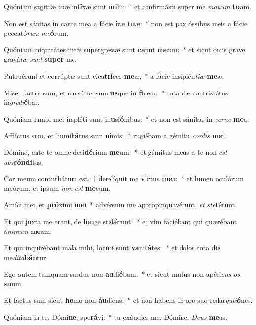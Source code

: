 \item Quóniam sagíttæ tuæ in\textbf{fí}xæ sunt \textbf{mi}hi:~* et confirmásti super me \textit{ma}\textit{num} \textbf{tu}am.
\item Non est sánitas in carne mea a fácie \textbf{i}ræ \textbf{tu}æ:~* non est pax óssibus meis a fácie peccató\textit{rum} \textit{me}\textbf{ó}rum.
\item Quóniam iniquitátes meæ supergréssæ sunt \textbf{ca}put \textbf{me}um:~* et sicut onus grave gravá\textit{tæ} \textit{sunt} \textbf{su}\textbf{per} me.
\item Putruérunt et corrúptæ sunt cica\textbf{trí}ces \textbf{me}æ,~* a fácie insipién\textit{ti}\textit{æ} \textbf{me}æ.
\item Miser factus sum, et curvátus sum \textbf{us}que in \textbf{fi}nem:~* tota die contristátus in\textit{gre}\textit{di}\textbf{é}bar.
\item Quóniam lumbi mei impléti sunt il\textbf{lu}si\textbf{ó}nibus:~* et non est sánitas in \textit{car}\textit{ne} \textbf{me}a.
\item Afflíctus sum, et humili\textbf{á}tus sum \textbf{ni}mis:~* rugiébam a gémitu \textit{cor}\textit{dis} \textbf{me}i.
\item Dómine, ante te omne desi\textbf{dé}rium \textbf{me}um:~* et gémitus meus a te non \textit{est} \textit{abs}\textbf{cón}\textbf{di}tus.
\item Cor meum conturbátum est,~† derelíquit me \textbf{vir}tus \textbf{me}a:~* et lumen oculórum meórum, et ipsum \textit{non} \textit{est} \textbf{me}cum.
\item Amíci mei, et \textbf{pró}ximi \textbf{me}i~* advérsum me appropinquavérunt, \textit{et} \textit{ste}\textbf{té}runt.
\item Et qui juxta me erant, de \textbf{lon}ge ste\textbf{té}runt:~* et vim faciébant qui quærébant á\textit{ni}\textit{mam} \textbf{me}am.
\item Et qui inquirébant mala mihi, locúti sunt \textbf{va}ni\textbf{tá}tes:~* et dolos tota die me\textit{di}\textit{ta}\textbf{bán}tur.
\item Ego autem tamquam surdus non \textbf{au}di\textbf{é}bam:~* et sicut mutus non apéri\textit{ens} \textit{os} \textbf{su}um.
\item Et factus sum sicut \textbf{ho}mo non \textbf{áu}diens:~* et non habens in ore suo redar\textit{gu}\textit{ti}\textbf{ó}nes.
\item Quóniam in te, Dómi\textbf{ne}, spe\textbf{rá}vi:~* tu exáudies me, Dómine, \textit{De}\textit{us} \textbf{me}us.
